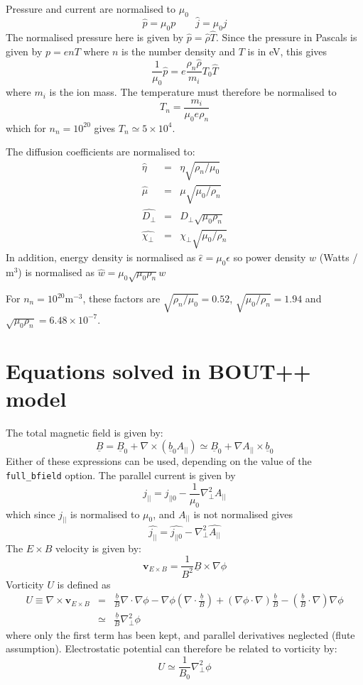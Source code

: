 \documentclass[12pt]{article}
\newcommand{\Vec}[1]{\ensuremath{\mathbf{#1}}}
\newcommand{\Div}[1]{\ensuremath{\nabla\cdot #1 }}
\newcommand{\Curl}[1]{\ensuremath{\nabla\times #1 }}
\newcommand{\Bvec}{\ensuremath{\underline{B}}}
\newcommand{\bvec}{\ensuremath{\underline{b}}}
\newcommand{\apar}{\ensuremath{A_{||}}}
\begin{document}
Pressure and current are normalised to $\mu_0$
\[
\hat{p} = \mu_0 p \qquad \hat{j} = \mu_0 j
\]
The normalised pressure here is given by $\hat{p} = \hat{\rho}\hat{T}$.
Since the pressure in Pascals is given by $p = enT$ where $n$ is the number
density and $T$ is in eV, this gives
\[
\frac{1}{\mu_0}\hat{p} = e\frac{\rho_n\hat{\rho}}{m_i} T_0\hat{T}
\]
where $m_i$ is the ion mass. The temperature must therefore be normalised to
\[
T_n = \frac{m_i}{\mu_0 e \rho_n}
\]
which for $n_n=10^{20}$ gives $T_n\simeq 5\times 10^4$.

The diffusion coefficients are normalised to:
\begin{eqnarray*}
\hat{\eta} &=& \eta\sqrt{\rho_n / \mu_0} \\
\hat{\mu} &=& \mu\sqrt{\mu_0/\rho_n} \\
\hat{D_\perp} &=& D_\perp\sqrt{\mu_0\rho_n} \\
\hat{\chi_\perp} &=& \chi_\perp\sqrt{\mu_0/\rho_n}
\end{eqnarray*}
In addition, energy density is normalised as $\hat{\epsilon} = \mu_0\epsilon$ so
power density $w$ (Watts / m$^3$) is normalised as 
$\hat{w} = \mu_0\sqrt{\mu_0\rho_n} w$

For $n_n=10^{20}$m$^{-3}$, these factors are $\sqrt{\rho_n / \mu_0} = 0.52$, $\sqrt{\mu_0/\rho_n}=1.94$ and $\sqrt{\mu_0\rho_n} = 6.48\times 10^{-7}$. 

\section{Equations solved in BOUT++ model}

The total magnetic field is given by:
\[
\Bvec = \Bvec_0 + \nabla\times\left(\bvec_0\apar\right) \simeq \Bvec_0 + \nabla\apar \times\bvec_0
\]
Either of these expressions can be used, depending on the value of the \texttt{full\_bfield} option. The parallel current is given by
\[
j_{||} = j_{||0} - \frac{1}{\mu_0}\nabla_\perp^2\apar
\]
which since $j_{||}$ is normalised to $\mu_0$, and $\apar$ is not normalised gives
\[
\hat{j_{||}} = \hat{j_{||0}} - \nabla_\perp^2\hat{\apar}
\]
The $E\times B$ velocity is given by:
\[
\Vec{v}_{E\times B} = \frac{1}{B^2}\Bvec\times\nabla\phi
\]
Vorticity $U$ is defined as 
\begin{eqnarray*}
U \equiv \Curl{\Vec{v}_{E\times B}} &=& \frac{\bvec}{B}\Div{\nabla\phi} - \nabla\phi\left(\Div{\frac{\bvec}{B}}\right) + \left(\nabla\phi\cdot\nabla\right)\frac{\bvec}{B} - \left(\frac{\bvec}{B}\cdot\nabla\right)\nabla\phi \\
&\simeq& \frac{\bvec}{B}\nabla_\perp^2\phi
\end{eqnarray*}
where only the first term has been kept, and parallel derivatives neglected (flute assumption). Electrostatic potential can therefore be related to 
vorticity by:
\[
U \simeq \frac{1}{B_0}\nabla_\perp^2\phi
\]
\end{document}
